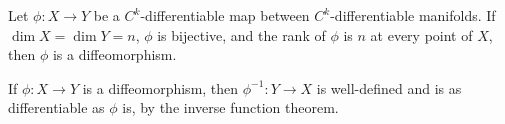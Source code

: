 Let $\phi: X \to Y$ be a $C^k$-differentiable map between $C^k$-differentiable manifolds. If $\dim X = \dim Y = n$, $\phi$ is bijective, and the rank of $\phi$ is $n$ at every point of $X$, then $\phi$ is a diffeomorphism.

If $\phi: X \to Y$ is a diffeomorphism, then $\phi^{-1}: Y \to X$ is well-defined and is as differentiable as $\phi$ is, by the inverse function theorem.
